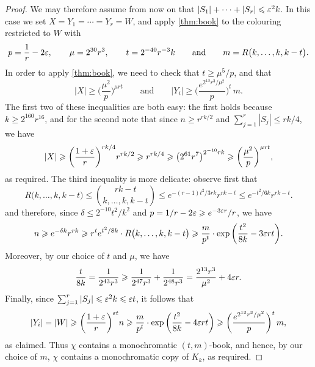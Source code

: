 \begin{proof}
  We may therefore assume from now on that  \(|S_1| + \cdots + |S_r| \leqslant \varepsilon^2 k\). 
  In this case we set \(X = Y_1 = \cdots = Y_r = W\), and apply \autoref{thm:book} to the colouring restricted to \(W\) with 
  \begin{equation*}
    p = \frac{1}{r} - 2\varepsilon, \qquad \mu = 2^{30} r^3, \qquad t = 2^{-40} r^{-3} k \qquad \text{and} \qquad m = R\big( k, \ldots, k, k - t \big).
  \end{equation*}
  In order to apply \autoref{thm:book}, we need to check that \(t \ge \mu^5/p\), and that
  \begin{equation*}
    |X| \ge \bigg( \frac{\mu^2}{p} \bigg)^{\mu r t} \qquad \text{and} \qquad |Y_i| \ge \bigg( \frac{e^{2^{13} r^3 / \mu^2}}{p} \bigg)^t \, m.
  \end{equation*}
  The first two of these inequalities are both easy: the first holds because \(k \ge 2^{160} r^{16}\), and for the second note that since \(n \ge r^{rk/2}\) and \(\sum_{j = 1}^r |S_j| \le rk/4\), we have
  \begin{equation*}
    |X| \geqslant \bigg( \frac{1+\varepsilon}{r} \bigg)^{rk/4} r^{rk/2} \geqslant r^{rk/4} \geqslant \big( 2^{61} r^7 \big)^{2^{-10} r k} \geqslant \bigg( \frac{\mu^2}{p} \bigg)^{\mu r t},
  \end{equation*}
  as required. The third inequality is more delicate: observe first that 
  \begin{equation*}
    R\big( k, \ldots, k, k-t \big) \le \binom{rk-t}{k,\dots,k,k-t} \le e^{-(r-1)t^2/3rk} r^{rk-t} \le e^{-t^2/6k} r^{rk-t}.
  \end{equation*}
  and therefore, since \(\delta \le 2^{-10} t^2/k^2\) and \(p = 1/r - 2\varepsilon \geqslant e^{-3\varepsilon r} / r\), we have 
  \begin{equation*}
    n \geqslant e^{-\delta k} r^{rk} \geqslant r^t e^{t^2/8k} \cdot R\big( k, \ldots, k, k-t \big) \geqslant \frac{m}{p^t} \cdot \exp\bigg( \frac{t^2}{8k} - 3\varepsilon r t \bigg).
  \end{equation*}
  Moreover, by our choice of \(t\) and \(\mu\), we have 
  \begin{equation*}
    \frac{t}{8k} = \frac{1}{2^{43} r^3} \geqslant \frac{1}{2^{47}r^3} + \frac{1}{2^{48}r^3} = \frac{2^{13} r^3}{\mu^2} + 4\varepsilon r.
  \end{equation*}
  Finally, since \(\sum_{j = 1}^r |S_j| \leqslant \varepsilon^2 k \leqslant \varepsilon t\), it follows that
  \begin{equation*}
    |Y_i| = |W| \geqslant \bigg( \frac{1+\varepsilon}{r} \bigg)^{\varepsilon t} n \geqslant \frac{m}{p^t} \cdot \exp\bigg( \frac{t^2}{8k} - 4\varepsilon r t \bigg) \geqslant \bigg( \frac{e^{2^{13} r^3 / \mu^2}}{p} \bigg)^t \, m,
  \end{equation*}
  as claimed. Thus \(\chi\) contains a monochromatic \((t,m)\)-book, and hence, by our choice of \(m\), \(\chi\) contains a monochromatic copy of \(K_k\), as required.
\end{proof}